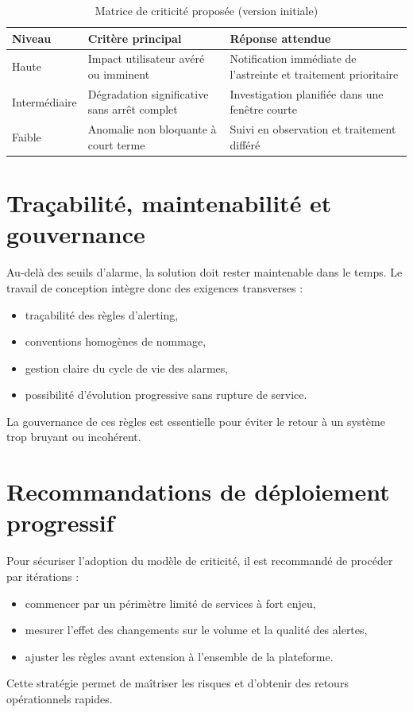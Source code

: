 \begin{table}[h]
	\centering
	\caption{Matrice de criticité proposée (version initiale)}
	\label{tab:criticite-initiale}
	\begin{tabular}{|p{}|p{}|p{}|}
		\hline
		\textbf{Niveau} & \textbf{Critère principal} & \textbf{Réponse attendue} \\
		\hline
		Haute & Impact utilisateur avéré ou imminent & Notification immédiate de l'astreinte et traitement prioritaire \\
		\hline
		Intermédiaire & Dégradation significative sans arrêt complet & Investigation planifiée dans une fenêtre courte \\
		\hline
		Faible & Anomalie non bloquante à court terme & Suivi en observation et traitement différé \\
		\hline
	\end{tabular}
\end{table}

\section{Traçabilité, maintenabilité et gouvernance}

Au-delà des seuils d'alarme, la solution doit rester maintenable dans le temps. Le travail de conception intègre
donc des exigences transverses :
\begin{itemize}
	\item traçabilité des règles d'alerting,
	\item conventions homogènes de nommage,
	\item gestion claire du cycle de vie des alarmes,
	\item possibilité d'évolution progressive sans rupture de service.
\end{itemize}

La gouvernance de ces règles est essentielle pour éviter le retour à un système trop bruyant ou incohérent.

\section{Recommandations de déploiement progressif}

Pour sécuriser l'adoption du modèle de criticité, il est recommandé de procéder par itérations :
\begin{itemize}
	\item commencer par un périmètre limité de services à fort enjeu,
	\item mesurer l'effet des changements sur le volume et la qualité des alertes,
	\item ajuster les règles avant extension à l'ensemble de la plateforme.
\end{itemize}

Cette stratégie permet de maîtriser les risques et d'obtenir des retours opérationnels rapides.